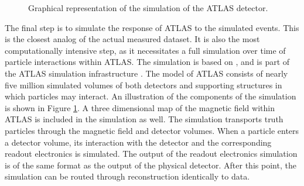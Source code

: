 \begin{figure}[h!]
\captionsetup[subfigure]{position=b}
\centering
{}
\caption{Graphical representation of the \geant simulation of the ATLAS detector.}
\label{fig:atlasGeantSim}
\end{figure}

The final step is to simulate the response of ATLAS to the simulated events.
This is the closest analog of the actual measured dataset.
It is also the most computationally intensive step, as it necessitates a full simulation over time of particle interactions within ATLAS.
The simulation is based on \geant \cite{geant}, and is part of the ATLAS simulation infrastructure \cite{SOFT-2010-01}.
The \geant model of ATLAS consists of nearly five million simulated volumes of both detectors and supporting structures in which particles may interact.
An illustration of the components of the simulation is shown in Figure \ref{fig:atlasGeantSim}.
A three dimensional map of the magnetic field within ATLAS is included in the simulation as well.
The simulation transports truth particles through the magnetic field and detector volumes.
When a particle enters a detector volume, its interaction with the detector and the corresponding readout electronics is simulated.
The output of the readout electronics simulation is of the same format as the output of the physical detector.
After this point, the simulation can be routed through reconstruction identically to data.

